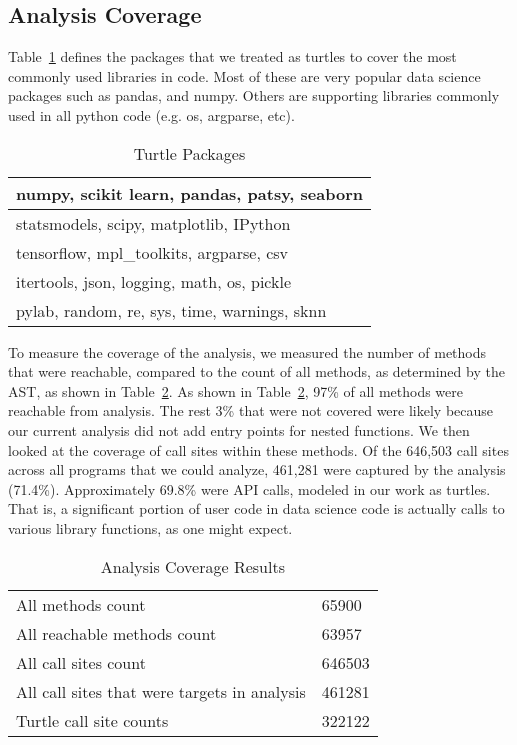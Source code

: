 \subsection{Analysis Coverage}

Table~\ref{turtles} defines the packages that we treated as turtles to cover the most commonly used libraries in code.  Most of these are very popular data science packages such as pandas, and numpy.  Others are supporting libraries commonly used in all python code (e.g. os, argparse, etc).  

\begin{table}
\begin{center}
\begin{tabular}{ |l|}
 \hline
numpy, scikit learn, pandas, patsy, seaborn \\ \hline
statsmodels, scipy, matplotlib, IPython \\ \hline
tensorflow, mpl\_toolkits, argparse, csv \\ \hline
itertools, json, logging, math, os, pickle \\ \hline
pylab, random, re, sys, time, warnings, sknn \\ \hline
\end{tabular}
\end{center}
\caption{Turtle Packages}
\label{turtles}
\end{table}
 
To measure the coverage of the analysis, we measured the number of methods that were reachable, compared to the count of all methods, as determined by the AST, as shown in Table~\ref{coverage}.  As shown in Table~\ref{coverage}, 97\% of all methods were reachable from analysis.  The rest 3\% that were not covered were likely because our current analysis did not add entry points for nested functions.  We then looked at the coverage of call sites within these methods.  Of the 646,503 call sites across all programs that we could analyze, 461,281 were captured by the analysis (71.4\%).  Approximately 69.8\% were API calls, modeled in our work as turtles.  That is, a significant portion of user code in data science code is actually calls to various library functions, as one might expect.


\begin{table}
\begin{center}
\begin{tabular}{ |l|l|}
 \hline
All methods count & 65900 \\
All reachable methods count & 63957 \\ \hline
All call sites count & 646503 \\ 
All call sites that were targets in analysis & 461281 \\
Turtle call site counts & 322122 \\ \hline
\end{tabular}
\end{center}
\caption{Analysis Coverage Results}
\label{coverage}
\end{table}


